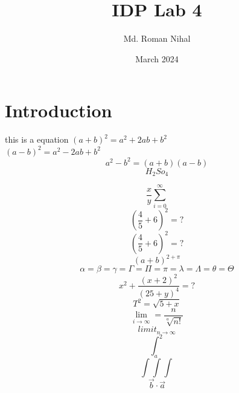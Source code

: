 \documentclass{report}
\title{IDP Lab 4}
\author{Md. Roman Nihal}
\date{March 2024}
\begin{document}
\maketitle

\section{Introduction}

this is a equation $(a+b)^2=a^2+2ab+b^2$\cite{DUMMY:1}\\
$(a-b)^2=a^2-2ab+b^2$
$$a^2-b^2=(a+b)(a-b)$$
$$H_2So_4$$

\begin{equation}
    \frac{x}{y}
    \sum_{i=0}^\infty
\end{equation}
$$(\frac{4}{5}+6)^2=?$$
$$\left(\frac{4}{5}+6\right)^2=?$$
$$(a+b)^{2+\pi}$$
$$\alpha=\beta=\gamma=\Gamma=\Pi=\pi=\lambda=\Lambda=\theta=\Theta$$
$$x^2+\frac{(x+2)^2}{(25+y)^4}=?$$
$$T^2=\sqrt{5+x}$$
$$\lim_{i\to\infty}=\frac{n}{\sqrt[a]{n!}}$$
$$limit_{n\to\infty}$$
$$\int_a^2$$
$$\int\int\int$$
$$\Vec{b}\cdot\Vec{a}$$



\end{document}
